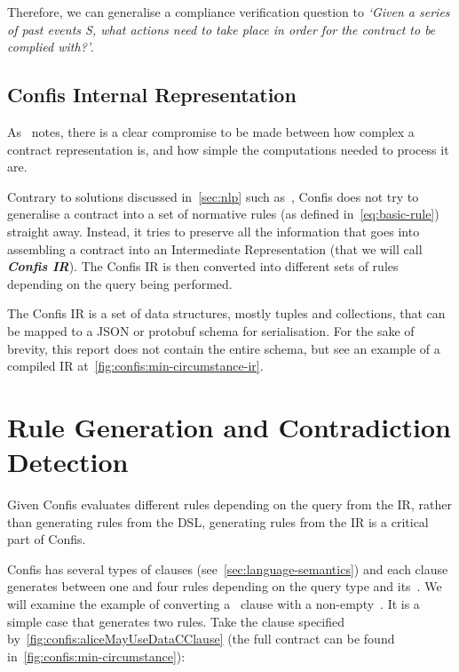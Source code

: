 Therefore, we can generalise a compliance verification question to \textit{`Given a series of past events S, what actions need to take place in order for the contract to be complied with?'}.

\subsection{Confis Internal Representation}\label{subsec:confis-ir}
As~\cite{knottenbeltContractDriven} notes, there is a clear compromise to be made between how complex a contract representation is, and how simple the computations needed to process it are.

Contrary to solutions discussed in~\autoref{sec:nlp} such as~\cite{sleimi2018NLP4}, Confis does not try to generalise a contract into a set of normative rules (as defined in~\autoref{eq:basic-rule}) straight away.
Instead, it tries to preserve all the information that goes into assembling a contract into an Intermediate Representation (that we will call \textbf{\emph{Confis IR}}).
The Confis IR is then converted into different sets of rules depending on the query being performed.

The Confis IR is a set of data structures, mostly tuples and collections, that can be mapped to a JSON or protobuf schema for serialisation.
For the sake of brevity, this report does not contain the entire schema, but see an example of a compiled IR at~\autoref{fig:confis:min-circumstance-ir}.


\section{Rule Generation and Contradiction Detection}\label{sec:rule-generation}

Given Confis evaluates different rules depending on the query from the IR, rather than generating rules from the DSL, generating rules from the IR is a critical part of Confis.

Confis has several types of clauses (see~\autoref{sec:language-semantics}) and each clause generates between one and four rules depending on the query type and its~.
We will examine the example of converting a~ clause with a non-empty~.
It is a simple case that generates two rules.
Take the clause specified by~\autoref{fig:confis:aliceMayUseDataCClause} (the full contract can be found in~\autoref{fig:confis:min-circumstance}):


